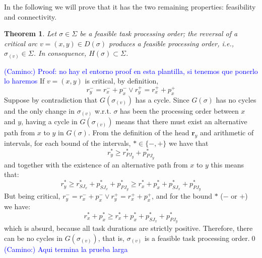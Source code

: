 \documentclass[preprint]{elsarticle}
\newcommand{\textcam}[1]{\textcolor{blue}{(Camino:) #1}}
\newtheorem{theorem}{Theorem}
\begin{document}
In the following we will prove that it has the two remaining properties: feasibility and connectivity.
\begin{theorem}\label{thFeasibilityH2}
Let $\sigma \in \Sigma$ be a feasible task processing order; the reversal of a critical arc $v=(x,y) \in D(\sigma)$ produces a feasible processing order, i.e., $\sigma_{(v)} \in \Sigma$. In consequence, $H(\sigma) \subset \Sigma$.
\end{theorem}
\textcam{Proof: no hay el entorno proof en esta plantilla, si tenemos que ponerlo lo haremos}
If $v=(x,y)$ is critical, by definition,
\begin{equation*}
r_y^- = r_x^- + p_x^- \lor r_y^+ = r_x^+ + p_x^+
\end{equation*}
Suppose by contradiction that $G(\sigma_{(v)})$ has a cycle. Since $G(\sigma)$ has no cycles and the only change in $\sigma_{(v)}$ w.r.t. $\sigma$ has been the processing order between $x$ and $y$, having a cycle in $G(\sigma_{(v)})$ means that there must exist an alternative path from $x$ to $y$ in $G(\sigma)$.
From the definition of the head $\mathbf{r}_y$ and arithmetic of intervals, for each bound of the intervals, $* \in \{-,+\}$ we have that
\begin{equation*}
r_y^* \geq r_{PJ_y}^* + p_{PJ_y}^*
\end{equation*}
and together with the existence of an alternative path from $x$ to $y$ this means that:
\begin{equation*}
r_y^* \geq r_{SJ_x}^* + p_{SJ_x}^* + p_{PJ_y}^* \geq r_x^* + p_x^* + p_{SJ_x}^* + p_{PJ_y}^*
\end{equation*}
But being critical, $r_y^- = r_x^- + p_x^- \lor r_y^+ = r_x^+ + p_x^+$, and for the bound $*$ ($-$ or $+$) we have:
\begin{equation*}
r_x^* + p_x^* \geq r_x^* + p_x^* + p_{SJ_x}^* + p_{PJ_y}^*
\end{equation*}
which is absurd, because all task durations are strictly positive. Therefore, there can be no cycles in $G(\sigma_{(v)})$, that is, $\sigma_{(v)}$ is a feasible task processing order.\qed
\textcam{Aqui termina la prueba larga}
\end{document}
